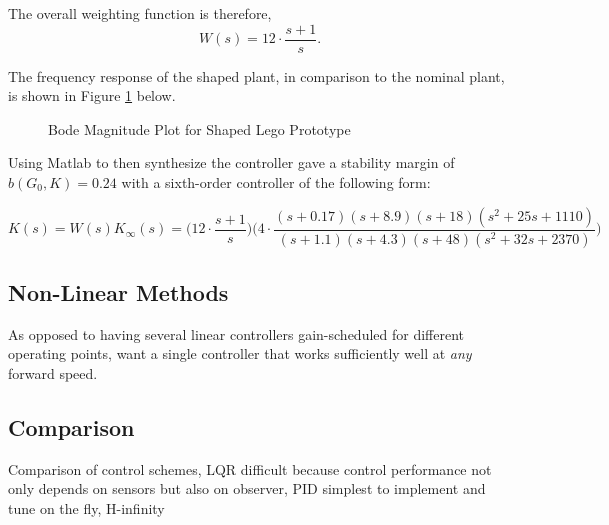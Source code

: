 The overall weighting function is therefore,
\begin{equation*}
W(s) = 12 \cdot \frac{s + 1}{s}.
\end{equation*}

The frequency response of the shaped plant, in comparison to the nominal plant, is shown in Figure \ref{fig:bodeLegoShaped} below.

\begin{figure}[H]
	\centering
	\caption{Bode Magnitude Plot for Shaped Lego Prototype}
	\label{fig:bodeLegoShaped}
\end{figure}

Using Matlab to then synthesize the controller gave a stability margin of $b(G_0,K) = 0.24$ with a sixth-order controller of the following form:

\begin{equation*}
K(s) = W(s) K_{\infty}(s) = \Big( 12 \cdot \frac{s+1}{s} \Big) \Big(4 \cdot \frac{(s+0.17)(s+8.9)(s+18)(s^2+25s+1110)}{(s+1.1)(s+4.3)(s+48)(s^2+32s+2370)} \Big)
\end{equation*}

\subsection{Non-Linear Methods}
As opposed to having several linear controllers gain-scheduled for different operating points, want a single controller that works sufficiently well at \textit{any} forward speed.

\subsection{Comparison}
Comparison of control schemes, LQR difficult because control performance not only depends on sensors but also on observer, PID simplest to implement and tune on the fly, H-infinity
